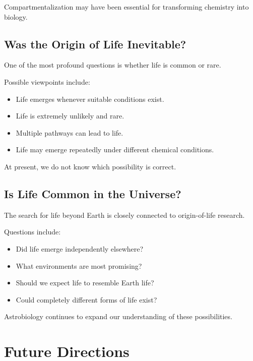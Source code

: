 \documentclass[
  oneside,
  openany]{book}
\providecommand{\tightlist}{%
  \setlength{\itemsep}{0pt}\setlength{\parskip}{0pt}}
\begin{document}
Compartmentalization may have been essential for transforming chemistry into biology.

\subsection{Was the Origin of Life Inevitable?}\label{was-the-origin-of-life-inevitable}

One of the most profound questions is whether life is common or rare.

Possible viewpoints include:

\begin{itemize}
\tightlist
\item
  Life emerges whenever suitable conditions exist.
\item
  Life is extremely unlikely and rare.
\item
  Multiple pathways can lead to life.
\item
  Life may emerge repeatedly under different chemical conditions.
\end{itemize}

At present, we do not know which possibility is correct.

\subsection{Is Life Common in the Universe?}\label{is-life-common-in-the-universe}

The search for life beyond Earth is closely connected to origin-of-life research.

Questions include:

\begin{itemize}
\tightlist
\item
  Did life emerge independently elsewhere?
\item
  What environments are most promising?
\item
  Should we expect life to resemble Earth life?
\item
  Could completely different forms of life exist?
\end{itemize}

Astrobiology continues to expand our understanding of these possibilities.

\section{Future Directions}\label{future-directions}
\end{document}
